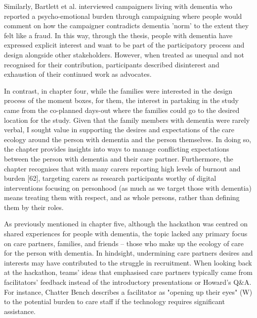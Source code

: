 Similarly, Bartlett et al. interviewed campaigners living with dementia who reported a psycho-emotional burden through campaigning where people would comment on how the campaigner contradicts dementia 'norm' to the extent they felt like a fraud. In this way, through the thesis, people with dementia have expressed explicit interest and want to be part of the participatory process and design alongside other stakeholders. However, when treated as unequal and not recognised for their contribution, participants described disinterest and exhaustion of their continued work as advocates. 

In contrast, in chapter four, while the families were interested in the design process of the moment boxes, for them, the interest in partaking in the study came from the co-planned days-out where the families could go to the desired location for the study. Given that the family members with dementia were rarely verbal, I sought value in supporting the desires and expectations of the care ecology around the person with dementia and the person themselves. In doing so, the chapter provides insights into ways to manage conflicting expectations between the person with dementia and their care partner. Furthermore, the chapter recognises that with many carers reporting high levels of burnout and burden [62],  targeting carers as research participants worthy of digital interventions focusing on personhood (as much as we target those with dementia) means treating them with respect, and as whole persons, rather than defining them by their roles. 

As previously mentioned in chapter five, although the hackathon was centred on shared experiences for people with dementia, the topic lacked any primary focus on care partners, families, and friends – those who make up the ecology of care for the person with dementia. In hindsight, undermining care partners desires and interests may have contributed to the struggle in recruitment. When looking back at the hackathon, teams' ideas that emphasised care partners typically came from facilitators' feedback instead of the introductory presentations or Howard's Q\&A. For instance, Chatter Bench describes a facilitator as "opening up their eyes" (W) to the potential burden to care staff if the technology requires significant assistance. 

